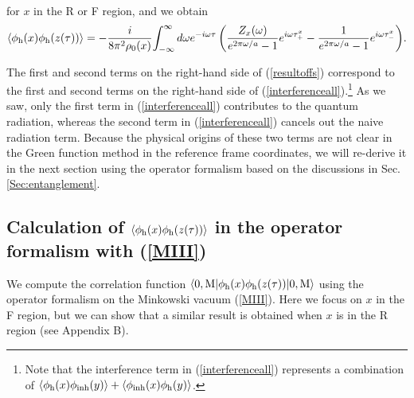 \documentclass[aps,prd,preprintnumbers,nofootinbib,showpacs]{revtex4}%
\begin{document}
\begin{widetext}
\begin{eqnarray}
\end{eqnarray}
for $x$ in the R or F region, and we obtain \cite{IYZ,IYZ2013}
\begin{eqnarray}
\langle\phi_{\rm h}(x)\phi_{\rm h}(z(\tau))\rangle=
-{i\over 8\pi^2\rho_0(x)}
\displaystyle{
\int_{-\infty}^{\infty}d\omega e^{-i\omega\tau}
\left(
{Z_x(\omega)\over e^{2\pi\omega/a}-1}e^{i\omega\tau_+^x}
-{1\over e^{2\pi\omega/a}-1}e^{i\omega\tau_-^x}
\right)}.
\label{resultoffs}
\end{eqnarray}

The first and second terms on the right-hand side of (\ref{resultoffs})
correspond to the first and second terms on the right-hand side of 
(\ref{interferenceall}).\footnote{Note that the interference term in (\ref{interferenceall}) 
represents a combination of $\langle\phi_{\rm h}(x)\phi_{\rm inh}(y)\rangle
+\langle\phi_{\rm inh}(x)\phi_{\rm h}(y)\rangle$. }
As we saw, 
only the first term in (\ref{interferenceall}) contributes to 
the quantum radiation, whereas the second term in (\ref{interferenceall}) cancels out the naive radiation term. 
Because the physical origins of these two terms are not clear in the Green function 
method in the reference frame coordinates,
we will re-derive it in the next section 
using the operator formalism based on the discussions in Sec. \ref{Sec:entanglement}.


\subsection{Calculation of $\langle\phi_{\rm h}(x)\phi_{\rm h}(z(\tau))\rangle$ in the operator 
formalism with (\ref{MIII})
\label{Sec:interference-operator}
}
We compute the correlation function 
$\langle0,{\rm M}|\phi_{\rm h}(x) \phi_{\rm h}(z(\tau))|0,{\rm M}\rangle$  
using the operator formalism on the Minkowski vacuum (\ref{MIII}). 
Here we focus on $x$ in the F region, but 
we can show that a similar result is obtained when $x$ is in the R region (see Appendix B). 


\end{widetext}
\end{document}
